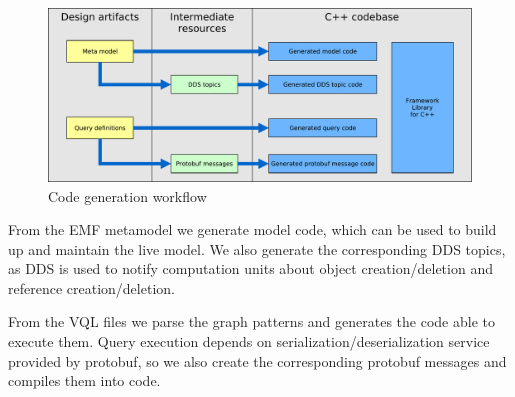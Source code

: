 \begin{figure}[H]
	\begin{center}
		\includegraphics[width=\textwidth]{figures/workflow.pdf}
		\caption{ Code generation workflow}
		\label{fig:workflow}
	\end{center}
\end{figure}

From the EMF metamodel we generate model code, which can be used to build up and maintain the live model. 
We also generate the corresponding DDS topics, as DDS is used to notify computation units about object creation/deletion and reference creation/deletion.

From the VQL files we parse the graph patterns and generates the code able to execute them.
Query execution depends on serialization/deserialization service provided by protobuf, so we also create the corresponding protobuf messages and compiles them into \cpp{} code.

